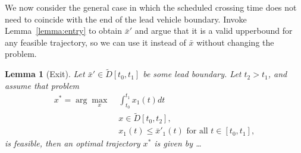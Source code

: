 \documentclass[a4paper]{article}
\theoremstyle{definition}
\theoremstyle{plain}
\newtheorem{lemma}{Lemma}
\begin{document}
We now consider the general case in which the scheduled crossing time does not
need to coincide with the end of the lead vehicle boundary.
%
Invoke Lemma~\ref{lemma:entry} to obtain $\bar{x}'$ and argue that it is a valid
upperbound for any feasible trajectory, so we can use it instead of $\bar{x}$
without changing the problem.

\begin{lemma}[Exit]
  \label{lemma:exit}
  Let $\bar{x}' \in \widetilde{D}[t_{0}, t_{1}]$ be some lead boundary. Let $t_{2} > t_{1}$, and assume that problem
  \begin{align*}
    x^{*} = \arg\max_{x} \; &\int_{t_{0}}^{t_{1}} x_{1}(t) dt \\
            &x \in \widetilde{D}[t_{0}, t_{2}] , \\
            &x_{1}(t) \leq \bar{x}'_{1}(t)  \text{ for all } t \in [t_{0}, t_{1}] ,
  \end{align*}
  is feasible, then an optimal trajectory $x^{*}$ is given by \dots
\end{lemma}
\end{document}
